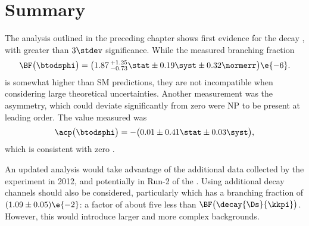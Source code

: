 \section{Summary}
\label{sec:dsphi:conc}

The analysis outlined in the preceding chapter shows first evidence for the decay \btodsphi, with
greater than $3\stdev$ significance.
While the measured branching fraction
\begin{equation*}
  \BF\big(\btodsphi\big) =
  \big(1.87\,^{+1.25}_{-0.73}\stat\pm0.19\syst\pm0.32\normerr\big)\e{-6}.
  \label{eq:dsphi:result}
\end{equation*}
is somewhat higher than SM predictions, they are not incompatible when considering large
theoretical uncertainties.
Another measurement was the \CP asymmetry, which could deviate significantly from zero were NP to
be present at leading order.
The value measured was
\begin{equation*}
  \acp\big(\btodsphi\big)=
  -\big(0.01\pm0.41\stat\pm0.03\syst\big),
\end{equation*}
which is consistent with zero \CPV.

An updated analysis would take advantage of the additional data collected by the \lhcb experiment
in 2012, and potentially in Run-2 of the \lhc.
Using additional \Ds decay channels should also be considered, particularly \decay{\Ds}{\pip\pipi}
which has a branching fraction of $(1.09\pm0.05)\e{-2}$: a factor of about five less than
$\BF\big(\decay{\Ds}{\kkpi}\big)$.
However, this would introduce larger and more complex backgrounds.






